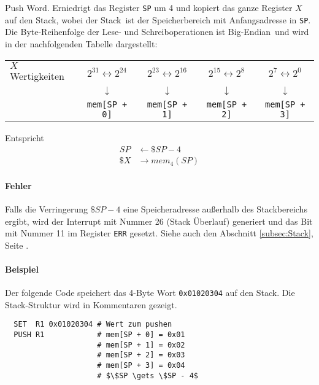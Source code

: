 \glqq Push Word\grqq.
Erniedrigt das Register \texttt{SP} um 4 und kopiert das ganze Register $X$ auf
den Stack, wobei der \glqq Stack\grqq\ ist der Speicherbereich mit
Anfangsadresse in \texttt{SP}.
Die Byte-Reihenfolge der Lese- und Schreiboperationen ist \glqq Big-Endian\grqq\
und wird in der nachfolgenden Tabelle dargestellt:
\begin{center}
\begin{tabular}{l|cccc}
  \toprule
  $X$  Wertigkeiten &
  $2^{31} \leftrightarrow 2^{24}$ &
  $2^{23} \leftrightarrow 2^{16}$ &
  $2^{15} \leftrightarrow 2^{8}$  &
  $2^{7}  \leftrightarrow 2^{0}$ 
  \\
  &
  $\downarrow$ & $\downarrow$ & $\downarrow$ & $\downarrow$ 
  \\
  \text{Stack-Bereich} &
  \texttt{mem[SP + 0]} &
  \texttt{mem[SP + 1]} &
  \texttt{mem[SP + 2]} &
  \texttt{mem[SP + 3]}
  \\\bottomrule
\end{tabular}
\end{center}


Entspricht
\begin{align*}
   SP & \gets \$SP - 4    \\
 \$X  & \to mem_{4}(SP)
\end{align*}


\paragraph{Fehler}
Falls die Verringerung $\$SP - 4$ eine Speicheradresse außerhalb des
Stackbereichs ergibt, wird der Interrupt mit Nummer 26 (Stack Überlauf)
\index{Stack!Überlauf}
generiert und das Bit mit Nummer 11 im Register \texttt{ERR} gesetzt.
Siehe auch den Abschnitt \ref{subsec:Stack}, Seite \pageref{subsec:Stack}.


\paragraph{Beispiel}
Der folgende Code speichert das 4-Byte Wort \texttt{0x01020304} auf den Stack.
Die Stack-Struktur wird in Kommentaren gezeigt.
\begin{lstlisting}
  SET  R1 0x01020304 # Wert zum pushen
  PUSH R1            # mem[SP + 0] = 0x01
                     # mem[SP + 1] = 0x02
                     # mem[SP + 2] = 0x03
                     # mem[SP + 3] = 0x04
                     # $\$SP \gets \$SP - 4$
\end{lstlisting}




